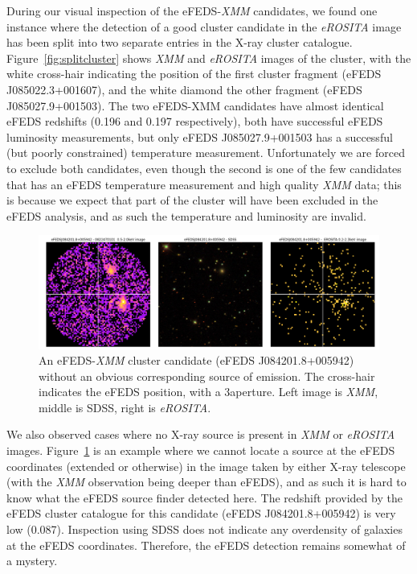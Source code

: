 \documentclass[fleqn,usenatbib]{mnras}
\begin{document}
During our visual inspection of the eFEDS-{\em XMM} candidates, we found one instance where the detection of a good cluster candidate in the {\em eROSITA} image has been split into two separate entries in the X-ray cluster catalogue. Figure~\ref{fig:splitcluster} shows {\em XMM} and {\em eROSITA} images of the cluster, with the white cross-hair indicating the position of the first cluster fragment (eFEDS J085022.3+001607), and the white diamond the other fragment (eFEDS J085027.9+001503). The two eFEDS-XMM candidates have almost identical eFEDS redshifts (0.196 and 0.197 respectively), both have successful eFEDS luminosity measurements, but only eFEDS J085027.9+001503 has a successful (but poorly constrained) temperature measurement. Unfortunately we are forced to exclude both candidates, even though the second is one of the few candidates that has an eFEDS temperature measurement and high quality {\em XMM} data; this is because we expect that part of the cluster will have been excluded in the eFEDS analysis, and as such the temperature and luminosity are invalid. 

\begin{figure}
    \centering
    \includegraphics[width=1\textwidth]{images/blanklowz_sdss.png}
    \caption[]{An eFEDS-{\em XMM} cluster candidate (eFEDS J084201.8+005942) without an obvious corresponding source of emission. The cross-hair indicates the eFEDS position, with a 3\arcmin aperture. Left image is {\em XMM}, middle is SDSS, right is {\em eROSITA}.}
    \label{fig:blanksky}
\end{figure}

We also observed cases where no X-ray source is present in {\em XMM} or {\em eROSITA} images. Figure~\ref{fig:blanksky} is an example where we cannot locate a source at the eFEDS coordinates (extended or otherwise) in the image taken by either X-ray telescope (with the {\em XMM} observation being deeper than eFEDS), and as such it is hard to know what the eFEDS source finder detected here. The redshift provided by the eFEDS cluster catalogue for this candidate (eFEDS J084201.8+005942) is very low (0.087).  Inspection using SDSS does not indicate any overdensity of galaxies at the eFEDS coordinates.  Therefore, the eFEDS detection remains somewhat of a mystery.  
\end{document}
